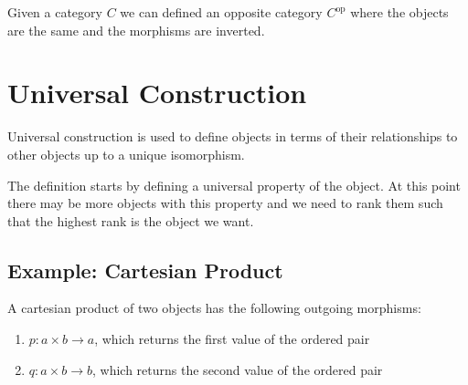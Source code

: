 \documentclass{article}
\newcommand{\opp}[1]{{#1}^{\text{op}}}
\begin{document}
Given a category \(C\) we can defined an opposite category \(\opp{C}\)
where the objects are the same and the morphisms are inverted.

\begin{minipage}{0.5\textwidth}
    \begin{center}
    \end{center}
\end{minipage}
\begin{minipage}{0.5\textwidth}
    \begin{center}
    \end{center}
\end{minipage}

\pagebreak

\section{Universal Construction}

Universal construction is used to define objects in terms of their
relationships to other objects up to a unique isomorphism.

The definition starts by defining a universal property of the object.
At this point there may be more objects with this property and we need to rank
them such that the highest rank is the object we want.

\subsection{Example: Cartesian Product}

A cartesian product of two objects has the following
outgoing morphisms:
\begin{enumerate}
    \item \(p:a\times b \to a\), which returns the first value of the ordered pair
    \item \(q:a\times b \to b\), which returns the second value of the ordered pair
\end{enumerate}
\end{document}
